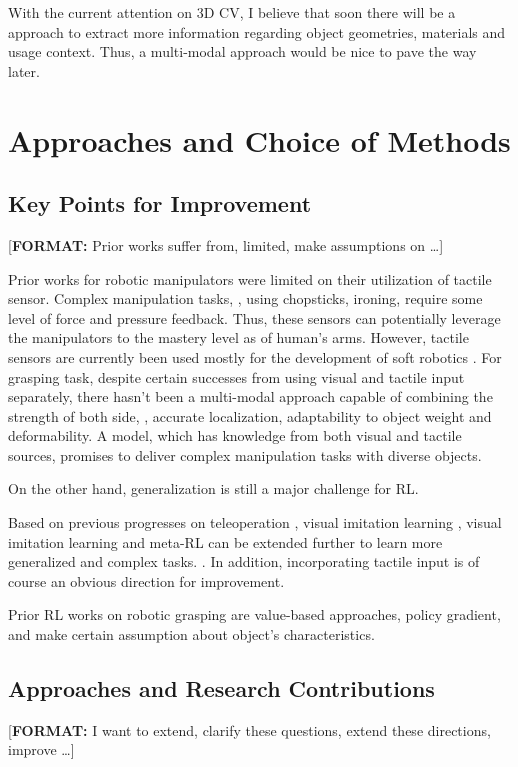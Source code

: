 With the current attention on 3D CV, I believe that soon there will be a approach to extract more information regarding object geometries, materials and usage context. Thus, a multi-modal approach would be nice to pave the way later.

\section{Approaches and Choice of Methods}
\subsection{Key Points for Improvement}
[\textbf{FORMAT:} Prior works suffer from, limited, make assumptions on \dots]

Prior works for robotic manipulators were limited on their utilization of tactile sensor. Complex manipulation tasks, \ie, using chopsticks, ironing, require some level of force and pressure feedback. Thus, these sensors can potentially leverage the manipulators to the mastery level as of human's arms. However, tactile sensors are currently been used mostly for the development of soft robotics \cite{haddadin2018tactile}. For grasping task, despite certain successes from using visual and tactile input separately, there hasn't been a multi-modal approach capable of combining the strength of both side, \ie, accurate localization, adaptability to object weight and deformability. A model, which has knowledge from both visual and tactile sources, promises to deliver complex manipulation tasks with diverse objects.

On the other hand, generalization is still a major challenge for \ac{RL}. 

Based on previous progresses on teleoperation \cite{handa2020dexpilot}, visual imitation learning \cite{finn2017one, sharma2019third}, visual imitation learning and meta-\ac{RL} can be extended further to learn more generalized and complex tasks. . In addition, incorporating tactile input is of course an obvious direction for improvement.

Prior \ac{RL} works on robotic grasping are value-based approaches, policy gradient, and make certain assumption about object's characteristics. \cite{li2019review}

\subsection{Approaches and Research Contributions}
[\textbf{FORMAT:} I want to extend, clarify these questions, extend these directions, improve \dots]

